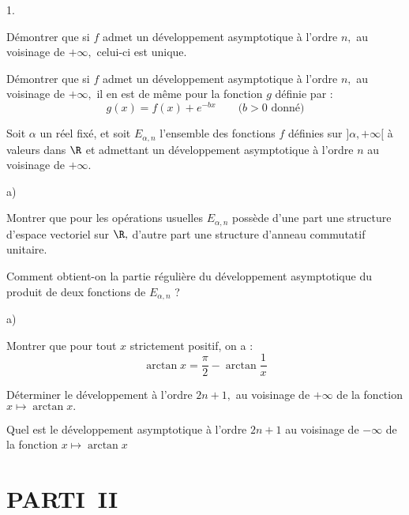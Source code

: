 \documentclass[11pt]{article}%
\begin{document}
\begin{noliste}{1.}
 \setlength{\itemsep}{4mm}
\item Démontrer que si $f$ admet un développement asymptotique à
l'ordre $n,$
au voisinage de $ + \infty,$ celui-ci est unique.

\item Démontrer que si $f$ admet un développement asymptotique à
l'ordre $n,$
au voisinage de $ + \infty,$ il en est de même pour la fonction $g$
définie
par :
\[
g(x) = f(x) + e^{-bx}\qquad \text{(}b>0\text{ donné)}
\]

\item Soit $\alpha $ un réel fixé, et soit $E_{\alpha,n}$ l'ensemble
des
fonctions $f$ définies sur $]\alpha, + \infty \lbrack $ à valeurs dans
$\R$ et admettant un développement asymptotique à l'ordre $n$ au
voisinage de $ + \infty.$

\begin{noliste}{a)}
 \setlength{\itemsep}{2mm}
\item Montrer que pour les opérations usuelles $E_{\alpha,n}$ possède
d'une
part une structure d'espace vectoriel sur $\R,$ d'autre part une
structure d'anneau commutatif unitaire.

\item Comment obtient-on la partie régulière du développement
asymptotique
du produit de deux fonctions de $E_{\alpha,n}$ ?
\end{noliste}

\item 

\begin{noliste}{a)}
 \setlength{\itemsep}{2mm}
\item Montrer que pour tout $x$ strictement positif, on a :
\[
\arctan x = \dfrac{\pi }{2}-\arctan \dfrac{1}{x}
\]

\item Déterminer le développement à l'ordre $2n + 1,$ au voisinage de $
+ \infty 
$ de la fonction $x\mapsto \arctan x.$

\item Quel est le développement asymptotique à l'ordre $2n + 1$ au
voisinage
de $-\infty $ de la fonction $x\mapsto \arctan x$
\end{noliste}
\end{noliste}

\section*{PARTI\E\ II}
\end{document}
